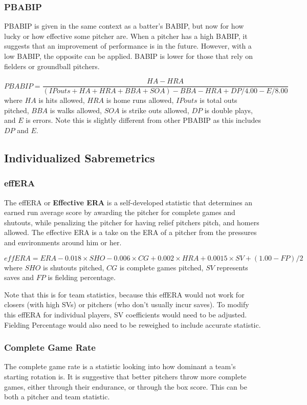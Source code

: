 \documentclass[12pt]{article}
\numberwithin{equation}{subsection}
\begin{document}
\subsubsection{PBABIP}
PBABIP is given in the same context as a batter's BABIP, but now for how lucky or how effective some pitcher are. When a pitcher has a high BABIP, it suggests that an improvement of performance is in the future. However, with a low BABIP, the opposite can be applied. BABIP is lower for those that rely on fielders or groundball pitchers.

\begin{equation}
	PBABIP = \frac{HA - HRA}{(IPouts + HA + HRA + BBA + SOA)-BBA - HRA + DP/4.00 - E/8.00}
\end{equation}
where $HA$ is hits allowed, $HRA$ is home runs allowed, $IPouts$ is total outs pitched, $BBA$ is walks allowed, $SOA$ is strike outs allowed, $DP$ is double plays, and $E$ is errors. Note this is slightly different from other PBABIP as this includes $DP$ and $E$.

\subsection{Individualized Sabremetrics}
\subsubsection{effERA}
The effERA or \textbf{Effective ERA} is a self-developed statistic that determines an earned run average score by awarding the pitcher for complete games and shutouts, while penalizing the pitcher for having relief pitchers pitch, and homers allowed. The effective ERA is a take on the ERA of a pitcher from the pressures and environments around him or her.

\begin{equation}
	effERA = ERA - 0.018\times SHO - 0.006 \times CG + 0.002 \times HRA + 0.0015 \times SV + (1.00 - FP)/2
\end{equation}
where $SHO$ is shutouts pitched, $CG$ is complete games pitched, $SV$ represents saves and $FP$ is fielding percentage.

Note that this is for team statistics, because this effERA would not work for closers (with high SVs) or pitchers (who don't usually incur saves). To modify this effERA for individual players, SV coefficients would need to be adjusted. Fielding Percentage would also need to be reweighed to include accurate statistic.

\subsubsection{Complete Game Rate}
The complete game rate is a statistic looking into how dominant a team's starting rotation is. It is suggestive that better pitchers throw more complete games, either through their endurance, or through the box score. This can be both a pitcher and team statistic.
\end{document}
